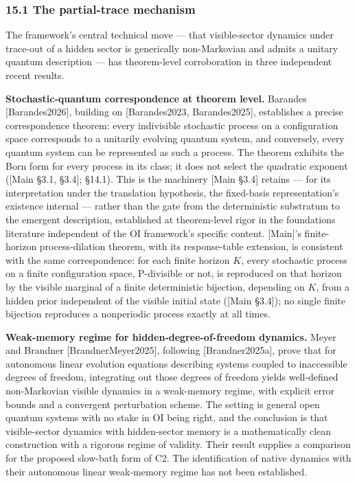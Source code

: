 \documentclass[
]{article}
\begin{document}
\hypertarget{the-partial-trace-mechanism}{%
\subsubsection{15.1 The partial-trace
mechanism}\label{the-partial-trace-mechanism}}

The framework's central technical move --- that visible-sector dynamics
under trace-out of a hidden sector is generically non-Markovian and
admits a unitary quantum description --- has theorem-level corroboration
in three independent recent results.

\textbf{Stochastic-quantum correspondence at theorem level.} Barandes
{[}Barandes2026{]}, building on {[}Barandes2023, Barandes2025{]},
establishes a precise correspondence theorem: every indivisible
stochastic process on a configuration space corresponds to a unitarily
evolving quantum system, and conversely, every quantum system can be
represented as such a process. The theorem exhibits the Born form for
every process in its class; it does not select the quadratic exponent
({[}Main §3.1, §3.4{]}; §14.1). This is the machinery {[}Main §3.4{]}
retains --- for its interpretation under the translation hypothesis, the
fixed-basis representation's existence internal --- rather than the gate
from the deterministic substratum to the emergent description,
established at theorem-level rigor in the foundations literature
independent of the OI framework's specific content. {[}Main{]}'s
finite-horizon process-dilation theorem, with its response-table
extension, is consistent with the same correspondence: for each finite
horizon \(K\), every stochastic process on a finite configuration space,
P-divisible or not, is reproduced on that horizon by the visible
marginal of a finite deterministic bijection, depending on \(K\), from a
hidden prior independent of the visible initial state ({[}Main §3.4{]});
no single finite bijection reproduces a nonperiodic process exactly at
all times.

\textbf{Weak-memory regime for hidden-degree-of-freedom dynamics.} Meyer
and Brandner {[}BrandnerMeyer2025{]}, following {[}Brandner2025a{]},
prove that for autonomous linear evolution equations describing systems
coupled to inaccessible degrees of freedom, integrating out those
degrees of freedom yields well-defined non-Markovian visible dynamics in
a weak-memory regime, with explicit error bounds and a convergent
perturbation scheme. The setting is general open quantum systems with no
stake in OI being right, and the conclusion is that visible-sector
dynamics with hidden-sector memory is a mathematically clean
construction with a rigorous regime of validity. Their result supplies a
comparison for the proposed slow-bath form of C2. The identification of
native dynamics with their autonomous linear weak-memory regime has not
been established.
\end{document}
